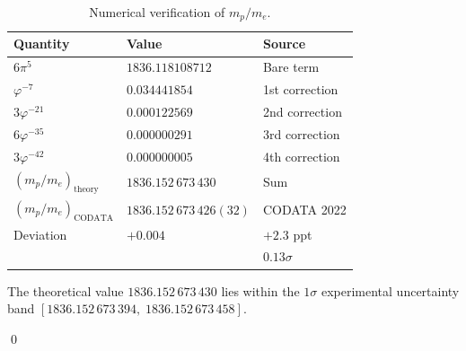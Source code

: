 \documentclass[11pt,a4paper]{article}
\theoremstyle{plain}
\theoremstyle{definition}
\newcommand{\vp}{\varphi}
\begin{document}
\begin{table}[htbp]
\centering
\caption{Numerical verification of $m_p/m_e$.}
\label{tab:verify}
\begin{tabular}{@{}lll@{}}
\toprule
Quantity & Value & Source \\
\midrule
$6\pi^5$ & $1836.118108712$ & Bare term \\
$\vp^{-7}$ & $0.034441854$ & 1st correction \\
$3\vp^{-21}$ & $0.000122569$ & 2nd correction \\
$6\vp^{-35}$ & $0.000000291$ & 3rd correction \\
$3\vp^{-42}$ & $0.000000005$ & 4th correction \\
\midrule
$(m_p/m_e)_{\mathrm{theory}}$ & $1836.152\,673\,430$ & Sum \\
$(m_p/m_e)_{\mathrm{CODATA}}$ & $1836.152\,673\,426(32)$ & CODATA 2022 \\
\midrule
Deviation & $+0.004$ & $+2.3$ ppt \\
 & & $0.13\sigma$ \\
\bottomrule
\end{tabular}
\end{table}

The theoretical value $1836.152\,673\,430$ lies within the $1\sigma$
experimental uncertainty band $[1836.152\,673\,394,\; 1836.152\,673\,458]$.

\qed
\end{document}
